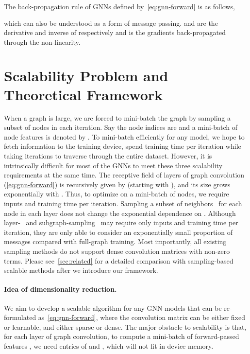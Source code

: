 \documentclass{article}
\newcommand{\cm}{\paragraph}
\begin{document}
The back-propagation rule of GNNs defined by~\cref{eq:gnn-forward} is as follows,

which can also be understood as a form of message passing.  and  are the derivative and inverse of  respectively and  is the gradients back-propagated through the non-linearity.

%
 \section{Scalability Problem and Theoretical Framework}
\label{sec:insight}



When a graph is large, we are forced to mini-batch the graph by sampling a subset of  nodes in each iteration. Say the node indices are  and a mini-batch of node features is denoted by . To mini-batch efficiently for any model, we hope to fetch  information to the training device, spend  training time per iteration while taking  iterations to traverse through the entire dataset. However, it is intrinsically difficult for most of the GNNs to meet these three scalability requirements at the same time. The receptive field of  layers of graph convolution (\cref{eq:gnn-forward}) is recursively given by  (starting with ), and its size grows exponentially with . Thus, to optimize on a mini-batch of  nodes, we require  inputs and training time per iteration. Sampling a subset of neighbors~\citep{hamilton2017inductive, chen2018stochastic} for each node in each layer does not change the exponential dependence on . Although layer-~\citep{chen2018fastgcn, huang2018adaptive} and subgraph-sampling~\citep{chiang2019cluster, zeng2019graphsaint} may require only  inputs and  training time per iteration, they are only able to consider an exponentially small proportion of messages compared with full-graph training. Most importantly, all existing sampling methods do not support dense convolution matrices with  non-zero terms. Please see~\cref{sec:related} for a detailed comparison with sampling-based scalable methods after we introduce our framework.



\cm{Idea of dimensionality reduction.}
We aim to develop a scalable algorithm for any GNN models that can be re-formulated as~\cref{eq:gnn-forward}, where the convolution matrix can be either fixed or learnable, and either sparse or dense. The major obstacle to scalability is that, for each layer of graph convolution, to compute a mini-batch of forward-passed features , we need  entries of  and , which will not fit in device memory. 
\end{document}
